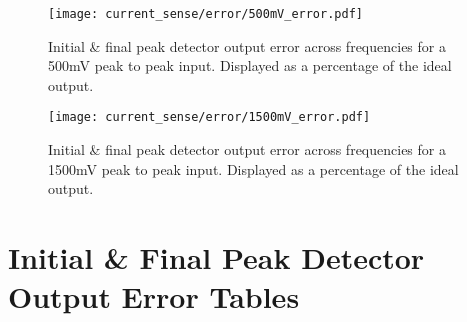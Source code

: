 \begin{figure}[H]
    \begin{center}
        \texttt{[image: current\_sense/error/500mV\_error.pdf]}
        \caption{Initial \& final peak detector output error across frequencies for a 500mV peak to peak input. Displayed as a percentage of the ideal output.}
    \end{center}
    \vspace{-20pt}
\end{figure}

\begin{figure}[H]
    \begin{center}
        \texttt{[image: current\_sense/error/1500mV\_error.pdf]}
        \caption{Initial \& final peak detector output error across frequencies for a 1500mV peak to peak input. Displayed as a percentage of the ideal output.}
    \end{center}
\end{figure}


\newpage
\section*{Initial \& Final Peak Detector Output Error Tables}\label{A:peak_detector_tables}



